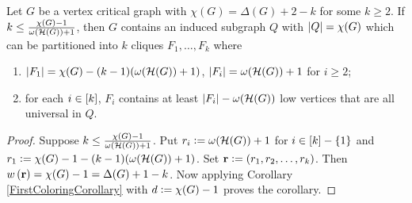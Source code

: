 	\begin{cor}\label{SecondColoring}
	Let $G$ be a vertex critical graph with $\chi(G) = \Delta(G) + 2 - k$ for some
	$k \geq 2$.  If $k \leq \frac{\chi(G) - 1}{\omega(\mathcal{H}(G)) + 1}$,
	then $G$ contains an induced subgraph $Q$ with $\left|Q\right| = \chi(G)$ which can be partitioned into $k$ cliques $F_1, \ldots, F_k$ where 
					\begin{enumerate}
					\item $\left|F_1\right| = \chi(G) - (k-1)(\omega(\mathcal{H}(G)) + 1)$, $\left|F_i\right| = \omega(\mathcal{H}(G)) + 1$ for $i \geq 2$;
					\item for each $i \in \left[k\right]$, $F_i$ contains at least $\left|F_i\right| - \omega(\mathcal{H}(G))$ low vertices that are all universal in $Q$.
					\end{enumerate}
	\end{cor}
	\begin{proof}
		Suppose $k \leq \frac{\chi(G) - 1}{\omega(\mathcal{H}(G)) + 1}$.  Put
		$r_i \mathrel{\mathop:}= \omega(\mathcal{H}(G)) + 1$ for $i \in \left[k\right] - \left\{ 1 \right\}$ and $r_1
		\mathrel{\mathop:}= \chi(G) - 1 - (k-1)(\omega(\mathcal{H}(G)) + 1)$.  Set $\mathbf{r}
		\mathrel{\mathop:}= \left( r_1, r_2, \ldots, r_k \right)$.  Then $w\left( \mathbf{r} \right) = \chi(G) - 1
		= \Delta(G) + 1 - k$.  Now applying Corollary \ref{FirstColoringCorollary}
		with $d \mathrel{\mathop:}= \chi(G) - 1$ proves the corollary.
	\end{proof}
	
